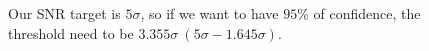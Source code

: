 \begin{figure}[hbt!]
    \centering
    \caption{Our SNR target is $5\sigma$, so if we want to have $95\% $ of confidence, the threshold need to be $3.355\sigma \  (5\sigma - 1.645\sigma)$. }
    \label{fig:SNR_histogram}
\end{figure}



